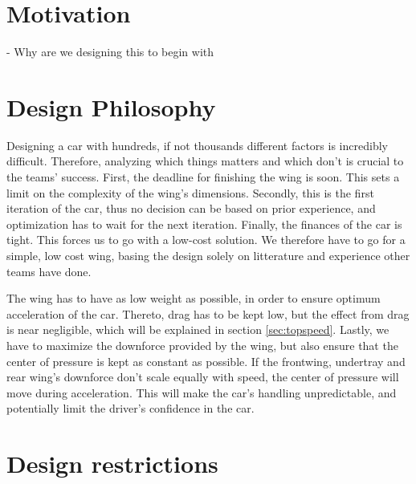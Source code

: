\section{Motivation}
- Why are we designing this to begin with

\section{Design Philosophy}


Designing a car with hundreds, if not thousands different factors is incredibly difficult. Therefore, analyzing which things matters and which don't is crucial to the teams' success. First, the deadline for finishing the wing is soon. This sets a limit on the complexity of the wing's dimensions. Secondly, this is the first iteration of the car, thus no decision can be based on prior experience, and optimization has to wait for the next iteration. Finally, the finances of the car is tight. This forces us to go with a low-cost solution. We therefore have to go for a simple, low cost wing, basing the design solely on litterature and experience other teams have done.

The wing has to have as low weight as possible, in order to ensure optimum acceleration of the car. Thereto, drag has to be kept low, but the effect from drag is near negligible, which will be explained in section \ref{sec:topspeed}. Lastly, we have to maximize the downforce provided by the wing, but also ensure that the center of pressure is kept as constant as possible. If the frontwing, undertray and rear wing's downforce don't scale equally with speed, the center of pressure will move during acceleration. This will make the car's handling unpredictable, and potentially limit the driver's confidence in the car.

\section{Design restrictions} %
